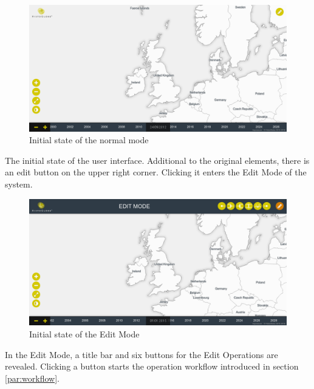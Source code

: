 \begin{minipage}[t]{0.47\textwidth}

  \begin{figure}[H]
    \centering
    \includegraphics[width=1.0\textwidth]{graphics/development/final_interface/1_init.png}
    \caption{Initial state of the normal mode}
    \label{fig:final_1_init}
  \end{figure}

  The initial state of the user interface. Additional to the original elements, there is an edit button on the upper right corner. Clicking it enters the Edit Mode of the system.

\end{minipage}    %
\hspace{1.5em}    %
\begin{minipage}[t]{0.47\textwidth}

  \begin{figure}[H]
    \centering
    \includegraphics[width=1.0\textwidth]{graphics/development/final_interface/2_edit_mode.png}
    \caption{Initial state of the Edit Mode}
    \label{fig:final_2_edit_mode}
  \end{figure}

  In the Edit Mode, a title bar and six buttons for the Edit Operations are   revealed. Clicking a button starts the operation workflow introduced in section \ref{par:workflow}.

\end{minipage}

